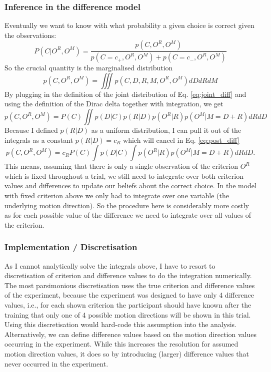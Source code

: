 \documentclass[10pt,a4paper]{article}
\begin{document}
\subsubsection{Inference in the difference model}
Eventually we want to know with what probability a given choice is correct given the observations:
\begin{equation}\label{eq:post_diff}
P(C | O^R, O^M) = \frac{p(C, O^R, O^M)}{p(C=c_+, O^R, O^M) + p(C=c_-, O^R, O^M)}
\end{equation}
So the crucial quantity is the marginalised distribution
\begin{equation}
p(C, O^R, O^M) = \iiint p(C, D, R, M, O^R, O^M) dD dR dM
\end{equation}
By plugging in the definition of the joint distribution of Eq. \eqref{eq:joint_diff} and using the definition of the Dirac delta together with integration, we get
\begin{equation}
p(C, O^R, O^M) = P(C) \iint p(D | C) p(R | D) p(O^R | R) p(O^M | M = D + R) dR dD
\end{equation}
Because I defined $p(R | D)$ as a uniform distribution, I can pull it out of the integrals as a constant $p(R | D) = c_R$ which will cancel in Eq. \eqref{eq:post_diff}
\begin{equation}
p(C, O^R, O^M) = c_R P(C) \int p(D | C) \int p(O^R | R) p(O^M | M = D + R) dR dD.
\end{equation}
This means, assuming that there is only a single observation of the criterion $O^R$ which is fixed throughout a trial, we still need to integrate over both criterion values and differences to update our beliefs about the correct choice. In the model with fixed criterion above we only had to integrate over one variable (the underlying motion direction). So the procedure here is considerably more costly as for each possible value of the difference we need to integrate over all values of the criterion.

\subsubsection{Implementation / Discretisation}
As I cannot analytically solve the integrals above, I have to resort to discretisation of criterion and difference values to do the integration numerically. The most parsimonious discretisation uses the true criterion and difference values of the experiment, because the experiment was designed to have only 4 difference values, i.e., for each shown criterion the participant should have known after the training that only one of 4 possible motion directions will be shown in this trial. Using this discretisation would hard-code this assumption into the analysis. Alternatively, we can define difference values based on the motion direction values occurring in the experiment. While this increases the resolution for assumed motion direction values, it does so by introducing (larger) difference values that never occurred in the experiment.
\end{document}
